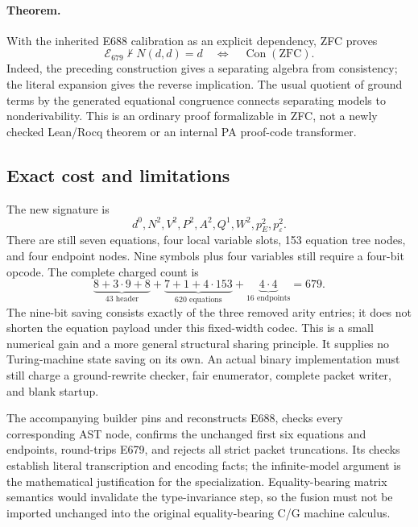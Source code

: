 \paragraph{Theorem.}
With the inherited E688 calibration as an explicit dependency, ZFC proves
\[
 \mathcal E_{679}\not\vdash N(d,d)=d
       \quad\Longleftrightarrow\quad
                  \operatorname{Con}(\mathrm{ZFC}).
\]
Indeed, the preceding construction gives a separating algebra from
consistency; the literal expansion gives the reverse implication.
The usual quotient of ground terms by the generated equational
congruence connects separating models to nonderivability.  This is an
ordinary proof formalizable in ZFC, not a newly checked Lean/Rocq theorem
or an internal PA proof-code transformer.

\subsection*{Exact cost and limitations}

The new signature is
\[
       d^0,N^2,V^2,P^2,A^2,Q^1,W^2,p_E^2,p_\varepsilon^2.
\]
There are still seven equations, four local variable slots, 153 equation
tree nodes, and four endpoint nodes.  Nine symbols plus four variables
still require a four-bit opcode.  The complete charged count is
\[
 \underbrace{8+3\cdot9+8}_{43\text{ header}}
 +\underbrace{7+1+4\cdot153}_{620\text{ equations}}
 +\underbrace{4\cdot4}_{16\text{ endpoints}}
 =679.
\]
The nine-bit saving consists exactly of the three removed arity entries;
it does not shorten the equation payload under this fixed-width codec.
This is a small numerical gain and a more general structural sharing
principle.  It supplies no Turing-machine state saving on its own.
An actual binary implementation must still charge a ground-rewrite
checker, fair enumerator, complete packet writer, and blank startup.

The accompanying builder pins and reconstructs E688, checks every
corresponding AST node, confirms the unchanged first six equations and
endpoints, round-trips E679, and rejects all strict packet truncations.
Its checks establish literal transcription and encoding facts; the
infinite-model argument is the mathematical justification for the
specialization.  Equality-bearing matrix semantics would invalidate the
type-invariance step, so the fusion must not be imported unchanged into
the original equality-bearing C/G machine calculus.

